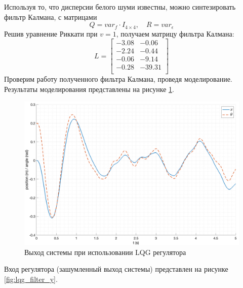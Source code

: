 Используя то, что дисперсии белого шуми известны, можно синтезировать фильтр Калмана, с матрицами 
\begin{equation}
    Q = var_f \cdot I_{4\times 4}, \quad R = var_\epsilon
\end{equation}
Решив уравнение Риккати при $v = 1$, получаем матрицу фильтра Калмана: 
\begin{equation}
    L = \begin{bmatrix}
        -3.08  & -0.06 \\ 
        -2.24  & -0.44 \\ 
        -0.06  & -9.14 \\ 
        -0.28  & -39.31 \\ 
    \end{bmatrix}
\end{equation}
Проверим работу полученного фильтра Калмана, проведя моделирование. Результаты моделирования представлены на рисунке \ref{fig:lqg_filter}. 
\begin{figure}[ht!]
    \centering
    \includegraphics[width=\textwidth]{media/plots/LQG/out_1.png}
    \caption{Выход системы при использовании LQG регулятора}
    \label{fig:lqg_filter}
\end{figure}
Вход регулятора (зашумленный выход системы) представлен на рисунке \ref{fig:lqg_filter_y}. 
